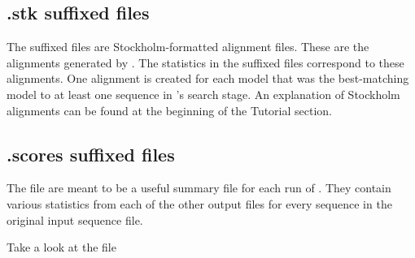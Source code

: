 \subsection{.stk suffixed files}
The  suffixed files are Stockholm-formatted alignment
files. These are the alignments generated by . The
statistics in the  suffixed files correspond to these
alignments. One alignment is created for each model that was the
best-matching model to at least one sequence in 's
search stage. An explanation of Stockholm alignments can be found at
the beginning of the Tutorial section.

\newpage

\subsection{.scores suffixed files}

The  file are meant to be a useful summary file for each
run of . They contain various statistics from each of
the other output files for every sequence in the original input
sequence file. 

Take a look at the file 

